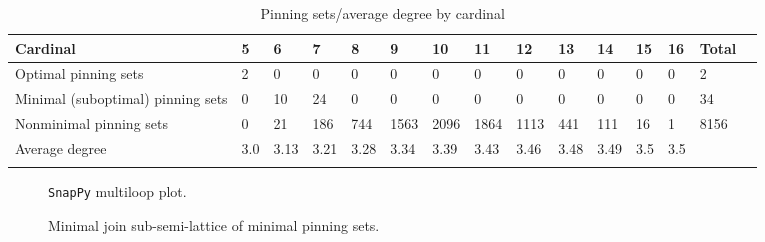 \documentclass{article}%
\begin{document}
\begin{table}[ht]
	\caption{Pinning sets/average degree by cardinal}
	\centering
	\renewcommand{\arraystretch}{1.5}
	\begin{tabularx}{\textwidth}{lXXXXXXXXXXXXXX}
		\toprule
			Cardinal & 5 & 6 & 7 & 8 & 9 & 10 & 11 & 12 & 13 & 14 & 15 & 16 & Total\\
			\hline
			Optimal pinning sets & 2 & 0 & 0 & 0 & 0 & 0 & 0 & 0 & 0 & 0 & 0 & 0 & 2 \\
			Minimal (suboptimal) pinning sets & 0 & 10 & 24 & 0 & 0 & 0 & 0 & 0 & 0 & 0 & 0 & 0 & 34 \\
			Nonminimal pinning sets & 0 & 21 & 186 & 744 & 1563 & 2096 & 1864 & 1113 & 441 & 111 & 16 & 1 & 8156 \\
			Average degree & 3.0 & 3.13 & 3.21 & 3.28 & 3.34 & 3.39 & 3.43 & 3.46 & 3.48 & 3.49 & 3.5 & 3.5 &  \\
		\bottomrule \\ 
	\end{tabularx}
\end{table}

\begin{multicols}{2}
\begin{figure}[H]
\centering

\caption{\texttt{SnapPy} multiloop plot.}
\label{fig:tex/img/[[4, 20, 1, 5], [5, 21, 6, 28], [3, 27, 4, 28], [19, 26, 20, 27], [1, 26, 2, 25], [21, 10, 22, 11], [6, 17, 7, 18], [18, 2, 19, 3], [13, 24, 14, 25], [14, 9, 15, 10], [22, 15, 23, 16], [11, 16, 12, 17.svg}
\end{figure}
\columnbreak

\begin{figure}[H]
\centering
\scalebox{0.8}{}
\caption{Minimal join sub-semi-lattice of minimal pinning sets.}
\label{fig:tex/img/[[4, 20, 1, 5], [5, 21, 6, 28], [3, 27, 4, 28], [19, 26, 20, 27], [1, 26, 2, 25], [21, 10, 22, 11], [6, 17, 7, 18], [18, 2, 19, 3], [13, 24, 14, 25], [14, 9, 15, 10], [22, 15, 23, 16], [11, 16, 12, 17.pgf}
\end{figure}
\end{multicols}
\end{document}

